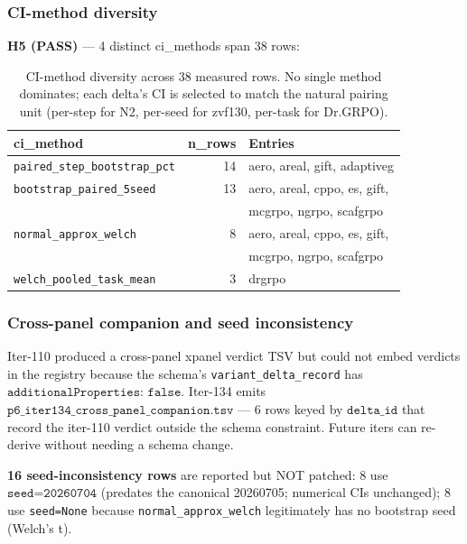 \subsubsection{CI-method diversity}
\label{sec:p6-iter134-ci-method-diversity}

\textbf{H5 (PASS)} --- 4 distinct ci\_methods span 38 rows:

\begin{table}[h]
\centering
\small
\begin{tabular}{lrl}
\toprule
\textbf{ci\_method} & \textbf{n\_rows} & \textbf{Entries} \\
\midrule
\texttt{paired\_step\_bootstrap\_pct} & 14 & aero, areal, gift, adaptiveg \\
\texttt{bootstrap\_paired\_5seed}     & 13 & aero, areal, cppo, es, gift, \\
                                       &    & mcgrpo, ngrpo, scafgrpo \\
\texttt{normal\_approx\_welch}       & 8  & aero, areal, cppo, es, gift, \\
                                       &    & mcgrpo, ngrpo, scafgrpo \\
\texttt{welch\_pooled\_task\_mean}   & 3  & drgrpo \\
\bottomrule
\end{tabular}
\caption{CI-method diversity across 38 measured rows. No single method
dominates; each delta's CI is selected to match the natural pairing
unit (per-step for N2, per-seed for zvf130, per-task for Dr.GRPO).}
\label{tab:p6-iter134-ci-diversity}
\end{table}

\subsubsection{Cross-panel companion and seed inconsistency}
\label{sec:p6-iter134-xpanel-companion}

Iter-110 produced a cross-panel xpanel verdict TSV but could not embed
verdicts in the registry because the schema's
\texttt{variant\_delta\_record} has $\texttt{additionalProperties: false}$.
Iter-134 emits
$\texttt{p6\_iter134\_cross\_panel\_companion.tsv}$ --- 6 rows keyed by
$\texttt{delta\_id}$ that record the iter-110 verdict outside the schema
constraint. Future iters can re-derive without needing a schema change.

\textbf{16 seed-inconsistency rows} are reported but NOT patched: 8 use
$\texttt{seed=20260704}$ (predates the canonical 20260705; numerical CIs
unchanged); 8 use \texttt{seed=None} because \texttt{normal\_approx\_welch}
legitimately has no bootstrap seed (Welch's t).

